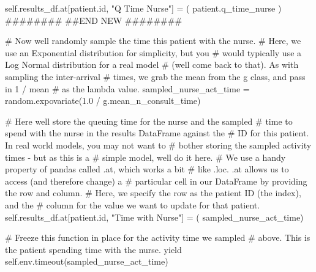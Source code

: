 \documentclass[
  letterpaper,
  DIV=11,
  numbers=noendperiod]{scrreprt}
\newenvironment{Shaded}{\begin{snugshade}}{\end{snugshade}}
\newcommand{\BuiltInTok}[1]{\textcolor[rgb]{0.00,0.23,0.31}{#1}}
\newcommand{\CommentTok}[1]{\textcolor[rgb]{0.37,0.37,0.37}{#1}}
\newcommand{\ControlFlowTok}[1]{\textcolor[rgb]{0.00,0.23,0.31}{#1}}
\newcommand{\FloatTok}[1]{\textcolor[rgb]{0.68,0.00,0.00}{#1}}
\newcommand{\NormalTok}[1]{\textcolor[rgb]{0.00,0.23,0.31}{#1}}
\newcommand{\OperatorTok}[1]{\textcolor[rgb]{0.37,0.37,0.37}{#1}}
\newcommand{\RegionMarkerTok}[1]{\textcolor[rgb]{0.00,0.23,0.31}{#1}}
\newcommand{\StringTok}[1]{\textcolor[rgb]{0.13,0.47,0.30}{#1}}
\newcommand{\VariableTok}[1]{\textcolor[rgb]{0.07,0.07,0.07}{#1}}
\begin{document}
\begin{tcolorbox}
\begin{Shaded}
\begin{Highlighting}[]
        \VariableTok{self}\NormalTok{.results\_df.at[patient.}\BuiltInTok{id}\NormalTok{, }\StringTok{"Q Time Nurse"}\NormalTok{] }\OperatorTok{=}\NormalTok{ (}
\NormalTok{          patient.q\_time\_nurse}
\NormalTok{        )}
        \CommentTok{\#\#\#\#\#\#\#\#}
        \CommentTok{\#\#}\RegionMarkerTok{END}\CommentTok{ NEW}
        \CommentTok{\#\#\#\#\#\#\#\#}

        \CommentTok{\# Now we\textquotesingle{}ll randomly sample the time this patient with the nurse.}
        \CommentTok{\# Here, we use an Exponential distribution for simplicity, but you}
        \CommentTok{\# would typically use a Log Normal distribution for a real model}
        \CommentTok{\# (we\textquotesingle{}ll come back to that).  As with sampling the inter{-}arrival}
        \CommentTok{\# times, we grab the mean from the g class, and pass in 1 / mean}
        \CommentTok{\# as the lambda value.}
\NormalTok{        sampled\_nurse\_act\_time }\OperatorTok{=}\NormalTok{ random.expovariate(}\FloatTok{1.0} \OperatorTok{/}
\NormalTok{                                                    g.mean\_n\_consult\_time)}

        \CommentTok{\# Here we\textquotesingle{}ll store the queuing time for the nurse and the sampled}
        \CommentTok{\# time to spend with the nurse in the results DataFrame against the}
        \CommentTok{\# ID for this patient.  In real world models, you may not want to}
        \CommentTok{\# bother storing the sampled activity times {-} but as this is a}
        \CommentTok{\# simple model, we\textquotesingle{}ll do it here.}
        \CommentTok{\# We use a handy property of pandas called .at, which works a bit}
        \CommentTok{\# like .loc.  .at allows us to access (and therefore change) a}
        \CommentTok{\# particular cell in our DataFrame by providing the row and column.}
        \CommentTok{\# Here, we specify the row as the patient ID (the index), and the}
        \CommentTok{\# column for the value we want to update for that patient.}
        \VariableTok{self}\NormalTok{.results\_df.at[patient.}\BuiltInTok{id}\NormalTok{, }\StringTok{"Time with Nurse"}\NormalTok{] }\OperatorTok{=}\NormalTok{ (}
\NormalTok{            sampled\_nurse\_act\_time)}

        \CommentTok{\# Freeze this function in place for the activity time we sampled}
        \CommentTok{\# above.  This is the patient spending time with the nurse.}
        \ControlFlowTok{yield} \VariableTok{self}\NormalTok{.env.timeout(sampled\_nurse\_act\_time)}


\end{Highlighting}
\end{Shaded}
\end{tcolorbox}
\end{document}
